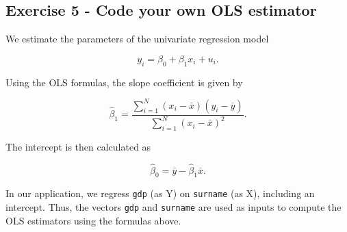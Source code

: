 \documentclass[
]{article}
\newenvironment{Shaded}{\begin{snugshade}}{\end{snugshade}}
\newcommand{\AttributeTok}[1]{\textcolor[rgb]{0.13,0.29,0.53}{#1}}
\newcommand{\CommentTok}[1]{\textcolor[rgb]{0.56,0.35,0.01}{\textit{#1}}}
\newcommand{\ControlFlowTok}[1]{\textcolor[rgb]{0.13,0.29,0.53}{\textbf{#1}}}
\newcommand{\DecValTok}[1]{\textcolor[rgb]{0.00,0.00,0.81}{#1}}
\newcommand{\FunctionTok}[1]{\textcolor[rgb]{0.13,0.29,0.53}{\textbf{#1}}}
\newcommand{\NormalTok}[1]{#1}
\newcommand{\OtherTok}[1]{\textcolor[rgb]{0.56,0.35,0.01}{#1}}
\newcommand{\SpecialCharTok}[1]{\textcolor[rgb]{0.81,0.36,0.00}{\textbf{#1}}}
\begin{document}
\subsection{Exercise 5 - Code your own OLS
estimator}\label{exercise-5---code-your-own-ols-estimator}

We estimate the parameters of the univariate regression model

\[
y_i = \beta_0 + \beta_1 x_i + u_i .
\]

Using the OLS formulas, the slope coefficient is given by

\[
\hat{\beta}_1 =
\frac{\sum_{i=1}^{N}(x_i-\bar{x})(y_i-\bar{y})}
{\sum_{i=1}^{N}(x_i-\bar{x})^2}.
\]

The intercept is then calculated as

\[
\hat{\beta}_0 = \bar{y} - \hat{\beta}_1 \bar{x}.
\]

In our application, we regress \texttt{gdp} (as Y) on \texttt{surname}
(as X), including an intercept. Thus, the vectors \texttt{gdp} and
\texttt{surname} are used as inputs to compute the OLS estimators using
the formulas above.

\begin{Shaded}
\end{Shaded}
\end{document}
